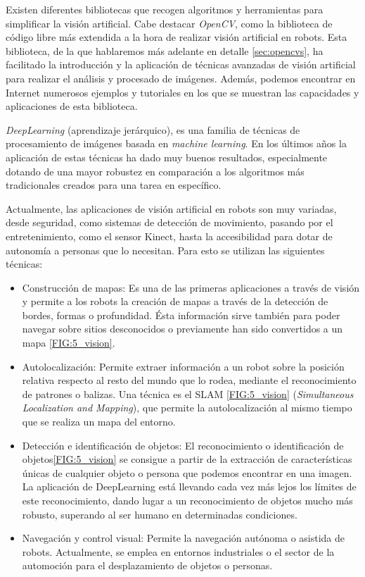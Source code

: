 Existen diferentes bibliotecas que recogen algoritmos y herramientas para simplificar la visión artificial. Cabe destacar \textit{OpenCV}, como la biblioteca  de código libre más extendida a la hora de realizar visión artificial en robots. Esta biblioteca, de la que hablaremos más adelante en detalle \ref{sec:opencvs}, ha facilitado la introducción y la aplicación de técnicas avanzadas de visión artificial para realizar el análisis y procesado de imágenes. Además, podemos encontrar en Internet numerosos ejemplos y tutoriales en los que se muestran las capacidades y aplicaciones de esta biblioteca.

\textit{DeepLearning} (aprendizaje jerárquico), es una familia de técnicas de procesamiento de imágenes basada en \textit{machine learning}. En los últimos años la aplicación de estas técnicas ha dado muy buenos resultados, especialmente dotando de una mayor robustez en comparación a los algoritmos más tradicionales creados para una tarea en específico. 

Actualmente, las aplicaciones de visión artificial en robots son muy variadas, desde seguridad, como sistemas de detección de movimiento, pasando por el entretenimiento, como el sensor Kinect, hasta la accesibilidad para dotar de autonomía a personas que lo necesitan. Para esto se utilizan las siguientes técnicas: 

\begin{itemize}
	\item Construcción de mapas: Es una de las primeras aplicaciones a través de visión y permite a los robots la creación de mapas a través de la detección de bordes, formas o profundidad. Ésta información sirve también para poder navegar sobre sitios desconocidos o previamente han sido convertidos a un mapa \ref{FIG:5_vision}.
	\item Autolocalización: Permite extraer información a un robot sobre la posición relativa respecto al resto del mundo que lo rodea, mediante el reconocimiento de patrones o balizas. Una técnica es el SLAM \ref{FIG:5_vision} (\textit{Simultaneous Localization and Mapping}), que permite la autolocalización al mismo tiempo que se realiza un mapa del entorno. 
	\item Detección e identificación de objetos: El reconocimiento o identificación de objetos\ref{FIG:5_vision} se consigue a partir de la extracción de características únicas de cualquier objeto o persona que podemos encontrar en una imagen. La aplicación de DeepLearning está llevando cada vez más lejos los límites de este reconocimiento, dando lugar a un reconocimiento de objetos mucho más robusto, superando al ser humano en determinadas condiciones.
	\item Navegación y control visual: Permite la navegación autónoma o asistida de robots. Actualmente, se emplea en entornos industriales o el sector de la automoción para el desplazamiento de objetos o personas.
\end{itemize}

